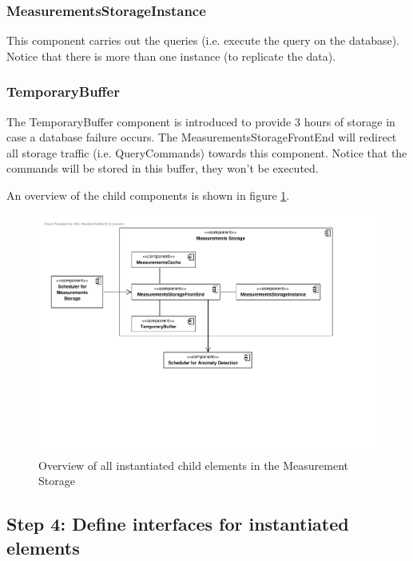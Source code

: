 \subsubsection{MeasurementsStorageInstance}

\npar This component carries out the queries (i.e. execute the query on the
database). Notice that there is more than one instance (to replicate the data).

\subsubsection{TemporaryBuffer}

\npar The TemporaryBuffer component is introduced to provide 3 hours of storage
in case a database failure occurs. The MeasurementsStorageFrontEnd will redirect
all storage traffic (i.e. QueryCommands) towards this component. Notice that the
commands will be stored in this buffer, they won't be executed.

\npar An overview of the child components is shown in figure
\ref{fig:it4/elements}.

\begin{figure}[H]
	\begin{centering}
		\includegraphics[width=\textwidth]{figs/add-it4-elements.pdf}
		\caption{Overview of all instantiated child elements in the Measurement
		Storage}
		\label{fig:it4/elements}
	\end{centering}
\end{figure}

\subsection{Step 4: Define interfaces for instantiated elements}
\label{add:it4/interfaces}


